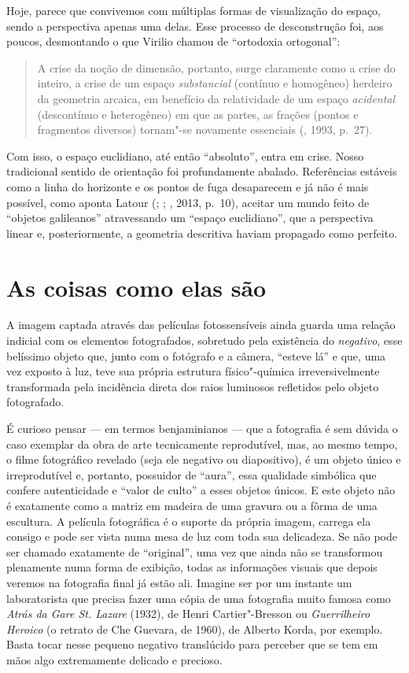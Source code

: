 Hoje, parece que convivemos com múltiplas formas de visualização do
espaço, sendo a perspectiva apenas uma delas. Esse processo de
desconstrução foi, aos poucos, desmontando o que Virilio chamou de
``ortodoxia ortogonal'':

\begin{quote}
A crise da noção de dimensão, portanto, surge claramente como a crise do
inteiro, a crise de um espaço \emph{substancial} (contínuo e homogêneo)
herdeiro da geometria arcaica, em benefício da relatividade de um espaço
\emph{acidental} (descontínuo e heterogêneo) em que as partes, as
frações (pontos e fragmentos diversos) tornam"-se novamente essenciais
(, 1993, p.~27).
\end{quote}

Com isso, o espaço euclidiano, até então ``absoluto'', entra em crise.
Nosso tradicional sentido de orientação foi profundamente abalado.
Referências estáveis como a linha do horizonte e os pontos de fuga
desaparecem e já não é mais possível, como aponta Latour (;
; , 2013, p.~10), aceitar um mundo feito de
``objetos galileanos'' atravessando um ``espaço euclidiano'', que a
perspectiva linear e, posteriormente, a geometria descritiva haviam
propagado como perfeito.

\chapter{As coisas como elas são}

A imagem captada através das películas fotossensíveis ainda guarda uma
relação indicial com os elementos fotografados, sobretudo pela
existência do \emph{negativo}, esse belíssimo objeto que, junto com o
fotógrafo e a câmera, ``esteve lá'' e que, uma vez exposto à luz, teve
sua própria estrutura físico"-química irreversivelmente transformada pela
incidência direta dos raios luminosos refletidos pelo objeto
fotografado.

É curioso pensar --- em termos benjaminianos --- que a fotografia é sem
dúvida o caso exemplar da obra de arte tecnicamente reprodutível, mas,
ao mesmo tempo, o filme fotográfico revelado (seja ele negativo ou
diapositivo), é um objeto único e irreprodutível e, portanto, possuidor
de ``aura'', essa qualidade simbólica que confere autenticidade e
``valor de culto'' a esses objetos únicos. E este objeto não é
exatamente como a matriz em madeira de uma gravura ou a fôrma de uma
escultura. A película fotográfica é o suporte da própria imagem, carrega
ela consigo e pode ser vista numa mesa de luz com toda sua delicadeza.
Se não pode ser chamado exatamente de ``original'', uma vez que ainda
não se transformou plenamente numa forma de exibição, todas as
informações visuais que depois veremos na fotografia final já estão ali.
Imagine ser por um instante um laboratorista que precisa fazer uma cópia
de uma fotografia muito famosa como \emph{Atrás da Gare St. Lazare}
(1932), de Henri Cartier"-Bresson ou \emph{Guerrilheiro Heroico} (o
retrato de Che Guevara, de 1960), de Alberto Korda, por exemplo. Basta
tocar nesse pequeno negativo translúcido para perceber que se tem em
mãos algo extremamente delicado e precioso.

